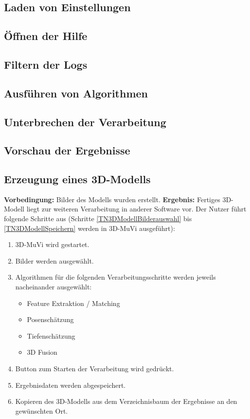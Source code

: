 \subsection{Laden von Einstellungen}
\label{usecase:5}
\subsection{Öffnen der Hilfe}
\label{usecase:6}
\subsection{Filtern der Logs}
\label{usecase:7}
\subsection{Ausführen von Algorithmen}
\label{usecase:8}
\subsection{Unterbrechen der Verarbeitung}
\label{usecase:9}
\subsection{Vorschau der Ergebnisse}
\label{usecase:10}


\iffalse
\subsection{Erzeugung eines 3D-Modells}
\textbf{Vorbedingung:} Bilder des Modells wurden erstellt. \newline
\textbf{Ergebnis:} Fertiges 3D-Modell liegt zur weiteren Verarbeitung in anderer Software vor. \newline
Der Nutzer führt folgende Schritte aus (Schritte \ref{TN3DModellBilderauswahl} bis \ref{TN3DModellSpeichern} werden in 3D-MuVi ausgeführt):
\begin{enumerate}
	\item 3D-MuVi wird gestartet.
	\item \label{TN3DModellBilderauswahl} Bilder werden ausgewählt.
	\item Algorithmen für die folgenden Verarbeitungsschritte werden jeweils nacheinander ausgewählt:
	\begin{itemize}
		\item Feature Extraktion / Matching
		\item Posenschätzung
		\item Tiefenschätzung
		\item 3D Fusion
	\end{itemize}
	\item Button zum Starten der Verarbeitung wird gedrückt.
	\item \label{TN3DModellSpeichern} Ergebnisdaten werden abgespeichert.
	\item Kopieren des 3D-Modells aus dem Verzeichnisbaum der Ergebnisse an den gewünschten Ort.
\end{enumerate}

